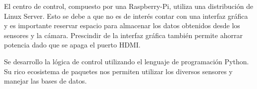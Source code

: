 El centro de control, compuesto por una Raspberry-Pi, utiliza una distribución de Linux Server. Esto se debe a que no es de interés contar con una interfaz gráfica y es importante reservar espacio para almacenar los datos obtenidos desde los sensores y la cámara. 
Prescindir de la interfaz gráfica también permite ahorrar potencia dado que se apaga el puerto HDMI.

Se desarrollo la lógica de control utilizando el lenguaje de programación Python. Su rico ecosistema de paquetes nos permiten utilizar los diversos sensores y manejar las bases de datos.











